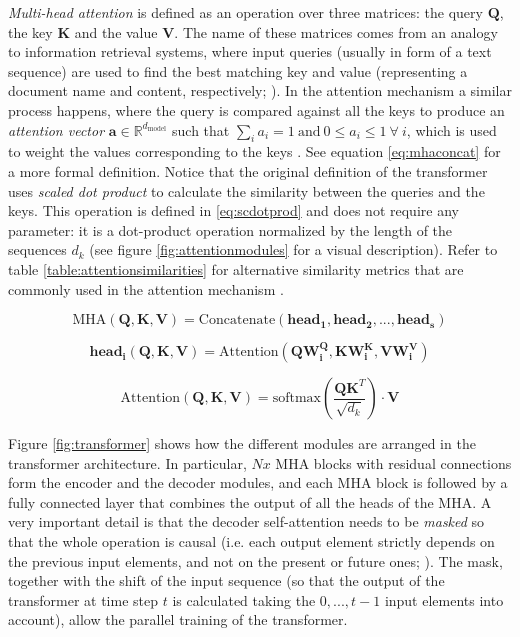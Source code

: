  \textit{Multi-head attention} is defined as an operation over three matrices: the query $\mathbf{Q}$, the key $\mathbf{K}$ and the value $\mathbf{V}$. The name of these matrices comes from an analogy to information retrieval systems, where input queries (usually in form of a text sequence) are used to find the best matching key and value (representing a document name and content, respectively; \citealp{manning2008}). In the attention mechanism a similar process happens, where the query is compared against all the keys to produce an \textit{attention vector} $\mathbf{a} \in \mathbb{R}^{d_{\mathrm{model}}}$ such that $\sum_{i} a_i = 1\ \mathrm{and}\ 0\leq a_i\leq 1\ \forall\ i$, which is used to weight the values corresponding to the keys \autocite{vaswani2017}. See equation \ref{eq:mhaconcat} for a more formal definition. Notice that the original definition of the transformer \autocite{vaswani2017} uses \textit{scaled dot product}  to calculate the similarity between the queries and the keys. This operation is defined in \ref{eq:scdotprod} and does not require any parameter: it is a dot-product operation normalized by the length of the sequences $d_k$ (see figure \ref{fig:attentionmodules} for a visual description). Refer to table \ref{table:attentionsimilarities} for alternative similarity metrics that are commonly used in the attention mechanism \autocite{uday2019}.

 \begin{equation}
 \label{eq:mhaconcat}
 \mathrm{MHA}(\mathbf{Q, K, V}) = \mathrm{Concatenate}(\mathrm{\mathbf{head_1}},\mathrm{\mathbf{head_2}},...,\mathrm{\mathbf{head_s}})
 \end{equation}


 \begin{equation}
 \label{eq:headsdef}
 \mathrm{\mathbf{head_i}}(\mathbf{Q,K,V}) = \mathrm{Attention}(\mathbf{Q} \mathbf{W^Q_i}, \mathbf{K} \mathbf{W^K_i}, \mathbf{V} \mathbf{W^V_i})
 \end{equation}

 \begin{equation}
 \label{eq:scdotprod}
 \mathrm{Attention}(\mathbf{Q, K, V}) = \mathrm{softmax} \left(\frac{\mathbf{QK}^T}{\sqrt{d_k}}\right) \cdot \mathbf{V}
 \end{equation}



Figure \ref{fig:transformer} shows how the different modules are arranged in the transformer architecture. In particular, $Nx$ MHA blocks with residual connections form the encoder and the decoder modules, and each MHA block is followed by a fully connected layer that combines the output of all the heads of the MHA. A very important detail is that the decoder self-attention needs to be \textit{masked} so that the whole operation is causal (i.e. each output element strictly depends on the previous input elements, and not on the present or future ones; \citealp{vaswani2017}). The mask, together with the shift of the input sequence (so that the output of the transformer at time step $t$ is calculated taking the $0,...,t-1$ input elements into account), allow the parallel training of the transformer.


